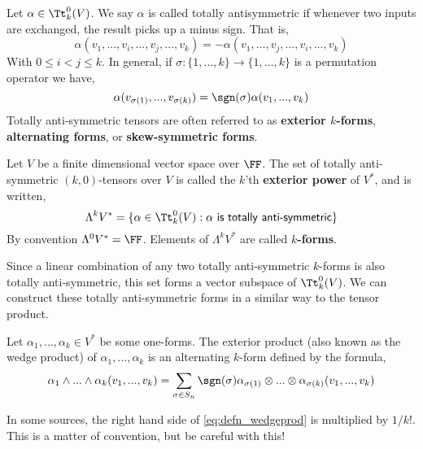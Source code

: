\begin{defn} 
Let $\alpha \in  \Tt_k^0(V)$. We say $\alpha$ is called totally antisymmetric if whenever two inputs are exchanged, the result picks up a minus sign. That is,
\[\alpha(v_1,...,v_i,...,v_j,...,v_k) = -\alpha(v_1,...,v_j,...,v_i,...,v_k)\]
With $0\leq i<j\leq k$. In general, if $\sigma : \{1,...,k\}\to \{1,...,k\}$ is a permutation operator we have,
\[\alpha(v_{\sigma(1)},...,v_{\sigma(k)}) = \sgn(\sigma)\alpha(v_1,...,v_k)\]
Totally anti-symmetric tensors are often referred to as \textbf{exterior $k$-forms}, \textbf{alternating forms}, or \textbf{skew-symmetric forms}.
\end{defn}
\begin{defn} 
Let $V$ be a finite dimensional vector space over $\FF$. The set of totally anti-symmetric $(k,0)$-tensors over $V$ is called the $k$'th \textbf{exterior power} of $V^*$, and is written,
\begin{equation}
    \Lambda^k V^* = \{\alpha \in \Tt_k^0(V) : \alpha \textsf{ is totally anti-symmetric}\}
\end{equation}
By convention $\Lambda^0 V^* = \FF$. Elements of $\Lambda^k V^*$ are called \textbf{$k$-forms}.
\end{defn}
Since a linear combination of any two totally anti-symmetric $k$-forms is also totally anti-symmetric, this set forms a vector subspace of $\Tt_k^0(V)$.  We can construct these totally anti-symmetric forms in a similar way to the tensor product.
\begin{defn} Let $\alpha_1,...,\alpha_k \in V^*$ be some one-forms. The exterior product (also known as the wedge product) of $\alpha_1,...,\alpha_k$ is an alternating $k$-form defined by the formula,
\begin{equation}
\alpha_1\wedge...\wedge \alpha_k(v_1,...,v_k) = \sum_{\sigma \in S_n}\sgn(\sigma)\alpha_{\sigma(1)}\otimes...\otimes \alpha_{\sigma(k)}(v_1,...,v_k) \label{eq:defn_wedgeprod}
\end{equation}
\end{defn}
\begin{remark*}
    In some sources, the right hand side of \eqref{eq:defn_wedgeprod} is multiplied by $1/k!$. This is a matter of convention, but be careful with this!
\end{remark*}
